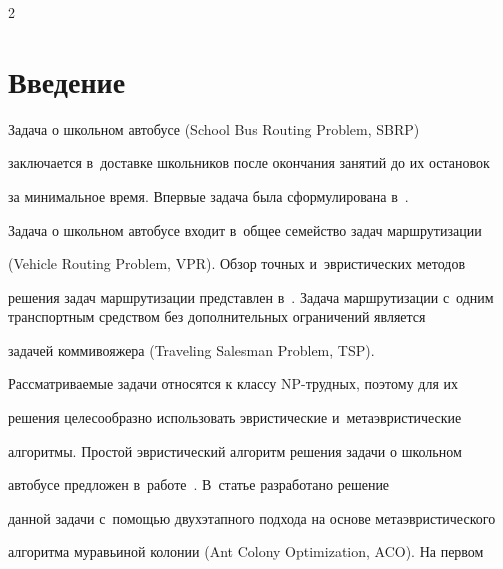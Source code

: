 








\thispagestyle{headings}



\begin{multicols}{2}



\label{st\stat}



\section{Введение}



     Задача о школьном автобусе (School Bus Routing Problem, SBRP)

заключается в~доставке школьников после окончания занятий до их остановок

за минимальное время. Впервые задача была сформулирована в~\cite{1-va}.

Задача о школьном автобусе входит в~общее семейство задач маршрутизации\linebreak

(Vehicle Routing Problem, VPR). Обзор точных и~эвристических методов

решения задач маршрутизации пред\-став\-лен в~\cite{2-va}. Задача маршрутизации с~одним транспортным средством без дополнительных ограничений является

задачей коммивояжера (Traveling Salesman Problem, TSP).



   Рассматриваемые задачи относятся к классу NP-труд\-ных, поэтому для их

решения целесообразно использовать эвристические и~метаэвристические

алгоритмы. Простой эвристический алгоритм решения задачи о школьном

автобусе предложен в~работе~\cite{3-va}. В~статье разработано решение

данной задачи с~помощью двухэтапного подхода на основе метаэвристического

алгоритма муравьиной колонии (Ant Colony Optimization, ACO). На первом


\end{multicols}
